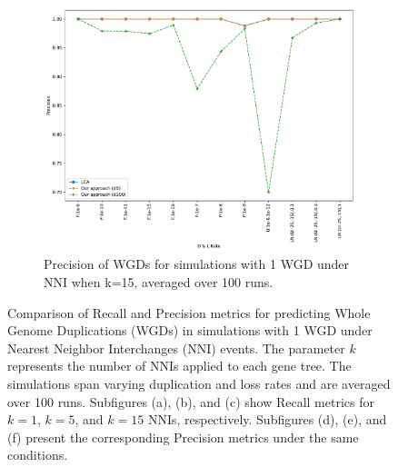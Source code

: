 \documentclass[10pt]{article}
\begin{document}
\begin{figure}[h!]
\begin{subfigure}[b]{0.31\textwidth}
        \label{fig:precision-NNI-k5-wgd}
    \end{subfigure}
    \hfill
    \begin{subfigure}[b]{0.31\textwidth}
        \centering
        \includegraphics[width=\textwidth]{figs/precision-NNI-K15-WGD-t20-t80-Avg.pdf}
        \caption{Precision of WGDs for simulations with 1 WGD under NNI when k=15, averaged over 100 runs.}
        \label{fig:precision-NNI-k15-wgd}
    \end{subfigure}
    
    \caption{
        Comparison of Recall and Precision metrics for predicting Whole Genome Duplications (WGDs) in simulations with 1 WGD under Nearest Neighbor Interchanges (NNI) events. The parameter $k$ represents the number of NNIs applied to each gene tree. The simulations span varying duplication and loss rates and are averaged over 100 runs. Subfigures (a), (b), and (c) show Recall metrics for $k=1$, $k=5$, and $k=15$ NNIs, respectively. Subfigures (d), (e), and (f) present the corresponding Precision metrics under the same conditions.
    }
    \label{fig:recall-precision-wgd-NNI}
\end{figure}
\end{document}
